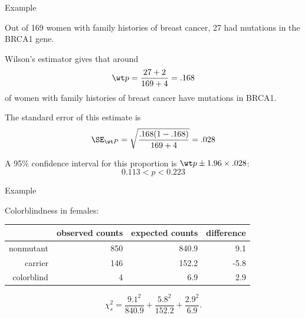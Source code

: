 \begin{frame}{Example}

    Out of 169 women with family histories of breast cancer, 27 had mutations in the BRCA1 gene.

    \pause
    \vspace{2em}

    \alert{Wilson's estimator} gives that around
        \[ \wt p = \frac{27 + 2}{169+4} = .168 \]
    of women with family histories of breast cancer have mutations in BRCA1.

    \vspace{2em}

    The \alert{standard error} of this estimate is
    \[ \SE_{\wt P} = \sqrt{\frac{.168(1-.168)}{169+4}} = .028  \]

    \vspace{2em}

    A \alert{95\% confidence interval} for this proportion is $\wt p \pm 1.96 \times .028$:
    \[ 0.113 < p < 0.223 \]

\end{frame}

\begin{frame}{Example}

    Colorblindness in females:
    \begin{center}
        \begin{tabular}{r|rrr}
            & observed counts & expected counts & difference\\
            \hline 
            nonmutant & 850 & 840.9 & 9.1 \\ 
            carrier &  146 & 152.2 & -5.8 \\ 
            colorblind & 4 & 6.9 & 2.9  \\
        \end{tabular}
    \end{center}

    \pause
    \vspace{2em}

    \[
        \chi^2_s = \frac{9.1^2}{840.9} + \frac{5.8^2}{152.2} + \frac{2.9^2}{6.9} .
    \]

\end{frame}

